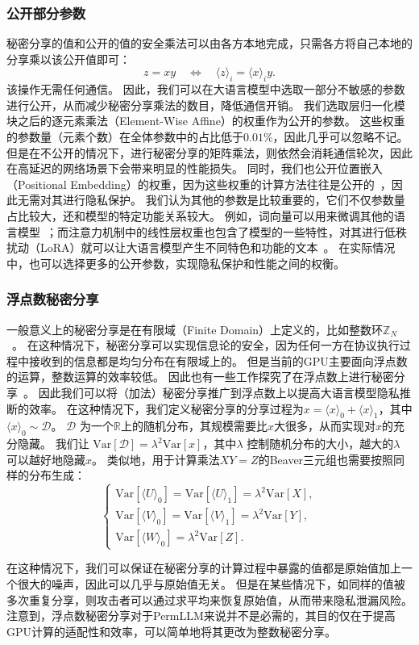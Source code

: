 \subsubsection{公开部分参数}
秘密分享的值和公开的值的安全乘法可以由各方本地完成，只需各方将自己本地的分享乘以该公开值即可：
\begin{equation}
    z = xy \quad \Leftrightarrow \quad \langle z \rangle_i = \langle x \rangle_i y.
\end{equation}
该操作无需任何通信。
%
因此，我们可以在大语言模型中选取一部分不敏感的参数进行公开，从而减少秘密分享乘法的数目，降低通信开销。
%
我们选取层归一化模块之后的逐元素乘法（Element-Wise Affine）的权重作为公开的参数。
%
这些权重的参数量（元素个数）在全体参数中的占比低于$0.01\%$，因此几乎可以忽略不记。
但是在不公开的情况下，进行秘密分享的矩阵乘法，则依然会消耗通信轮次，因此在高延迟的网络场景下会带来明显的性能损失。
%
同时，我们也公开位置嵌入（Positional Embedding）的权重，因为这些权重的计算方法往往是公开的~\cite{devlin_2019_bert,sujianlin_2024_rope}，因此无需对其进行隐私保护。
%
我们认为其他的参数是比较重要的，它们不仅参数量占比较大，还和模型的特定功能关系较大。
%
例如，词向量可以用来微调其他的语言模型~\cite{yeqi_2018_word_embedding_translation,lample_2016_ner}；而注意力机制中的线性层权重也包含了模型的一些特性，对其进行低秩扰动（LoRA）就可以让大语言模型产生不同特色和功能的文本~\cite{edward_2022_lora}。
%
在实际情况中，也可以选择更多的公开参数，实现隐私保护和性能之间的权衡。

%
\subsubsection{浮点数秘密分享}
一般意义上的秘密分享是在有限域（Finite Domain）上定义的，比如整数环$\mathbb Z_N$~\cite{shamir1979share}。
在这种情况下，秘密分享可以实现信息论的安全，因为任何一方在协议执行过程中接收到的信息都是均匀分布在有限域上的。
%
但是当前的GPU主要面向浮点数的运算，整数运算的效率较低。
因此也有一些工作探究了在浮点数上进行秘密分享~\cite{tjell_2021_real_sharing,gundersen_2023_real_sharing}。
因此我们可以将（加法）秘密分享推广到浮点数上以提高大语言模型隐私推断的效率。
%
在这种情况下，我们定义秘密分享的分享过程为$x = \langle x \rangle_0 + \langle x \rangle_1$，其中 $\langle x \rangle_0 \sim \mathcal D$。
%
$\mathcal D$ 为一个$\mathbb R$上的随机分布，其规模需要比$x$大很多，从而实现对$x$的充分隐藏。
%
我们让 $\text{Var}[\mathcal D] = \lambda^2 \text{Var}[x]$，其中$\lambda$ 控制随机分布的大小，越大的$\lambda$ 可以越好地隐藏$x$。
%
类似地，用于计算乘法$XY=Z$的Beaver三元组也需要按照同样的分布生成：
\begin{equation}
\begin{cases}
    \text{Var}[\langle U \rangle_0] = \text{Var}[\langle U \rangle_1] = \lambda^2 \text{Var}[X], \\
    \text{Var}[\langle V \rangle_0] = \text{Var}[\langle V \rangle_1] = \lambda^2 \text{Var}[Y], \\
    \text{Var}[\langle W \rangle_0] = \lambda^2 \text{Var}[Z].
\end{cases}
\end{equation}
%

在这种情况下，我们可以保证在秘密分享的计算过程中暴露的值都是原始值加上一个很大的噪声，因此可以几乎与原始值无关。
%
但是在某些情况下，如同样的值被多次重复分享，则攻击者可以通过求平均来恢复原始值，从而带来隐私泄漏风险。
%
注意到，浮点数秘密分享对于PermLLM来说并不是必需的，其目的仅在于提高GPU计算的适配性和效率，可以简单地将其更改为整数秘密分享。
%

